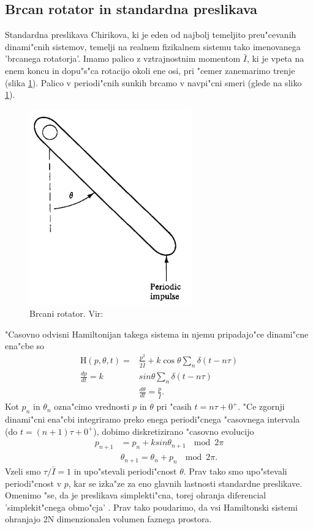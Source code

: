 \documentclass[]{article}
\begin{document}
\subsection{Brcan rotator in standardna preslikava}
Standardna preslikava Chirikova, ki je eden od najbolj temeljito preu"cevanih dinami"cnih sistemov, temelji na realnem fizikalnem sistemu tako imenovanega 'brcanega rotatorja'. Imamo palico z vztrajnostnim momentom $\bar{I}$, ki je vpeta na enem koncu in dopu"s"ca rotacijo okoli ene osi, pri "cemer zanemarimo trenje (slika \ref{slika 1}). Palico v periodi"cnih sunkih brcamo v navpi"cni smeri (glede na sliko \ref{slika 1}).
\begin{figure}[!htb]
	\begin{center}
		\includegraphics[width = 7cm]{kicked_rotator}
		\caption{Brcani rotator. Vir: \cite{1}}
		\label{slika 1}
	\end{center}
\end{figure}
"Casovno odvisni Hamiltonijan takega sistema in njemu pripadajo"ce dinami"cne ena"cbe so
\begin{equation}\label{1}
\begin{aligned}
\text{H}(p,\theta,t)=&\frac{p^2}{2\bar{I}}+k\cos\theta\sum_n\delta(t-n\tau)\\
\frac{dp}{dt}=k&sin\theta\sum_n\delta(t-n\tau)\\
&\frac{d\theta}{dt}=\frac{p}{\bar{I}}.
\end{aligned}
\end{equation}
Kot $p_n$ in $\theta_n$ ozna"cimo vrednosti $p$ in $\theta$ pri "casih $t=n\tau+0^+$. "Ce zgornji dinami"cni ena"cbi integriramo preko enega periodi"cnega "casovnega intervala (do $t=(n+1)\tau+0^+$), dobimo diskretizirano "casovno evolucijo
\begin{equation}\label{2}
\begin{aligned}
p_{n+1}&=p_n+ksin\theta_{n+1}\ \mod{2\pi}\\
&\theta_{n+1}=\theta_n+p_n\ \mod{2\pi}.
\end{aligned}
\end{equation}
Vzeli smo $\tau/\bar{I}=1$ in upo"stevali periodi"cnost $\theta$. Prav tako smo upo"stevali periodi"cnost v $p$, kar se izka"ze za eno glavnih lastnosti standardne preslikave. Omenimo "se, da je preslikava simplekti"cna, torej ohranja diferencial 'simplekit"cnega obmo"cja' \cite{1}. Prav tako poudarimo, da vsi Hamiltonski sistemi ohranjajo 2N dimenzionalen volumen faznega prostora.
\end{document}
